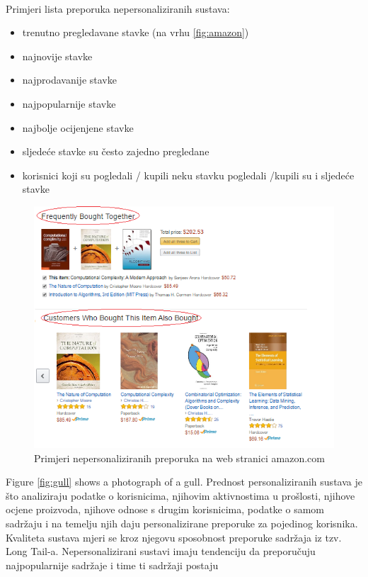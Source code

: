 \documentclass[a4paper,oneside,12pt]{memoir} %
\begin{document}
\bigskip
\\ Primjeri lista preporuka nepersonaliziranih sustava:
\begin{itemize}[topsep=2pt]
\setlength{\parskip}{0pt}
\item trenutno pregledavane stavke (na vrhu \ref{fig:amazon})
\item najnovije stavke
\item najprodavanije stavke
\item najpopularnije stavke
\item najbolje ocijenjene stavke
\item sljedeće stavke su često zajedno pregledane
\item korisnici koji su pogledali / kupili neku stavku pogledali /kupili su i sljedeće stavke
\end{itemize}
\bigskip
\begin{figure}[!h]
\begin{center}
\includegraphics[scale=1]{slike/amazon-non_personalized_recom.png}
\caption{Primjeri nepersonaliziranih preporuka na web stranici amazon.com}
\label{fig:amzon preporuke}
\end{center}
\end{figure}
\par 
Figure \ref{fig:gull} shows a photograph of a gull.
Prednost personaliziranih sustava je što analiziraju podatke o korisnicima, njihovim aktivnostima u prošlosti, njihove ocjene proizvoda, njihove odnose s drugim korisnicima, podatke o samom sadržaju i na temelju njih daju personalizirane preporuke za pojedinog korisnika. Kvaliteta sustava mjeri se kroz njegovu sposobnost preporuke sadržaja iz tzv. Long Tail-a. Nepersonalizirani sustavi imaju tendenciju da preporučuju najpopularnije sadržaje i time ti sadržaji postaju 
\end{document}
